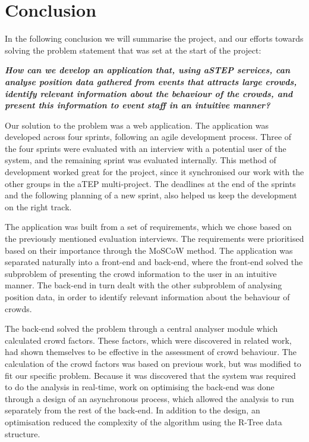 \chapter{Conclusion}\label{ch:conclusion}


In the following conclusion we will summarise the project, and our efforts towards solving the problem statement that was set at the start of the project:

\vspace{0.5 cm}
\begin{center}
	\textbf{\textit{How can we develop an application that, using aSTEP services, can analyse position data gathered from events that attracts large crowds, identify relevant information about the behaviour of the crowds, and present this information to event staff in an intuitive manner?}}
\end{center}

Our solution to the problem was a web application. The application was developed across four sprints, following an agile development process. Three of the four sprints were evaluated with an interview with a potential user of the system, and the remaining sprint was evaluated internally. This method of development worked great for the project, since it synchronised our work with the other groups in the aTEP multi-project. The deadlines at the end of the sprints and the following planning of a new sprint, also helped us keep the development on the right track.

The application was built from a set of requirements, which we chose based on the previously mentioned evaluation interviews. The requirements were prioritised based on their importance through the MoSCoW method.
The application was separated naturally into a front-end and back-end, where the front-end solved the subproblem of presenting the crowd information to the user in an intuitive manner. The back-end in turn dealt with the other subproblem of analysing position data, in order to identify relevant information about the behaviour of crowds.

The back-end solved the problem through a central analyser module which calculated crowd factors. These factors, which were discovered in related work, had shown themselves to be effective in the assessment of crowd behaviour. The calculation of the crowd factors was based on previous work, but was modified to fit our specific problem. Because it was discovered that the system was required to do the analysis in real-time, work on optimising the back-end was done through a design of an asynchronous process, which allowed the analysis to run separately from the rest of the back-end. In addition to the design, an optimisation reduced the complexity of the algorithm using the R-Tree data structure.

